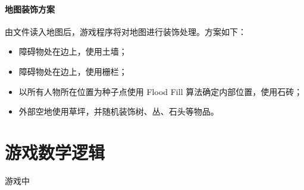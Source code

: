 \paragraph{地图装饰方案}
由文件读入地图后，游戏程序将对地图进行装饰处理。方案如下：
\begin{itemize}
	\item 障碍物处在边上，使用土墙；
	\item 障碍物处在边上，使用栅栏；
	\item 以所有人物所在位置为种子点使用 Flood Fill 算法确定内部位置，使用石砖；
	\item 外部空地使用草坪，并随机装饰树、丛、石头等物品。
\end{itemize}

\section{游戏数学逻辑}
游戏中


